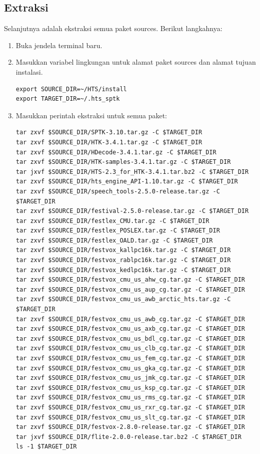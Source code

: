 \documentclass[12pt,]{article}
\begin{document}
	\subsection{Extraksi}
	
	Selanjutnya adalah ekstraksi semua paket sources.
	Berikut langkahnya:
	
	\begin{enumerate}
		\item Buka jendela terminal baru.
		
		\item Masukkan variabel lingkungan untuk alamat paket sources dan alamat tujuan instalasi.
		\begin{verbatim}
export SOURCE_DIR=~/HTS/install
export TARGET_DIR=~/.hts_sptk
		\end{verbatim}
		
		\item Masukkan perintah ekstraksi untuk semua paket:
		\begin{verbatim}
tar zxvf $SOURCE_DIR/SPTK-3.10.tar.gz -C $TARGET_DIR
tar zxvf $SOURCE_DIR/HTK-3.4.1.tar.gz -C $TARGET_DIR
tar zxvf $SOURCE_DIR/HDecode-3.4.1.tar.gz -C $TARGET_DIR
tar zxvf $SOURCE_DIR/HTK-samples-3.4.1.tar.gz -C $TARGET_DIR
tar jxvf $SOURCE_DIR/HTS-2.3_for_HTK-3.4.1.tar.bz2 -C $TARGET_DIR
tar zxvf $SOURCE_DIR/hts_engine_API-1.10.tar.gz -C $TARGET_DIR
tar zxvf $SOURCE_DIR/speech_tools-2.5.0-release.tar.gz -C $TARGET_DIR
tar zxvf $SOURCE_DIR/festival-2.5.0-release.tar.gz -C $TARGET_DIR
tar zxvf $SOURCE_DIR/festlex_CMU.tar.gz -C $TARGET_DIR
tar zxvf $SOURCE_DIR/festlex_POSLEX.tar.gz -C $TARGET_DIR
tar zxvf $SOURCE_DIR/festlex_OALD.tar.gz -C $TARGET_DIR
tar zxvf $SOURCE_DIR/festvox_kallpc16k.tar.gz -C $TARGET_DIR
tar zxvf $SOURCE_DIR/festvox_rablpc16k.tar.gz -C $TARGET_DIR
tar zxvf $SOURCE_DIR/festvox_kedlpc16k.tar.gz -C $TARGET_DIR
tar zxvf $SOURCE_DIR/festvox_cmu_us_ahw_cg.tar.gz -C $TARGET_DIR
tar zxvf $SOURCE_DIR/festvox_cmu_us_aup_cg.tar.gz -C $TARGET_DIR
tar zxvf $SOURCE_DIR/festvox_cmu_us_awb_arctic_hts.tar.gz -C $TARGET_DIR
tar zxvf $SOURCE_DIR/festvox_cmu_us_awb_cg.tar.gz -C $TARGET_DIR
tar zxvf $SOURCE_DIR/festvox_cmu_us_axb_cg.tar.gz -C $TARGET_DIR
tar zxvf $SOURCE_DIR/festvox_cmu_us_bdl_cg.tar.gz -C $TARGET_DIR
tar zxvf $SOURCE_DIR/festvox_cmu_us_clb_cg.tar.gz -C $TARGET_DIR
tar zxvf $SOURCE_DIR/festvox_cmu_us_fem_cg.tar.gz -C $TARGET_DIR
tar zxvf $SOURCE_DIR/festvox_cmu_us_gka_cg.tar.gz -C $TARGET_DIR
tar zxvf $SOURCE_DIR/festvox_cmu_us_jmk_cg.tar.gz -C $TARGET_DIR
tar zxvf $SOURCE_DIR/festvox_cmu_us_ksp_cg.tar.gz -C $TARGET_DIR
tar zxvf $SOURCE_DIR/festvox_cmu_us_rms_cg.tar.gz -C $TARGET_DIR
tar zxvf $SOURCE_DIR/festvox_cmu_us_rxr_cg.tar.gz -C $TARGET_DIR
tar zxvf $SOURCE_DIR/festvox_cmu_us_slt_cg.tar.gz -C $TARGET_DIR
tar zxvf $SOURCE_DIR/festvox-2.8.0-release.tar.gz -C $TARGET_DIR
tar jxvf $SOURCE_DIR/flite-2.0.0-release.tar.bz2 -C $TARGET_DIR
ls -1 $TARGET_DIR
		\end{verbatim}
		

\end{enumerate}
\end{document}
